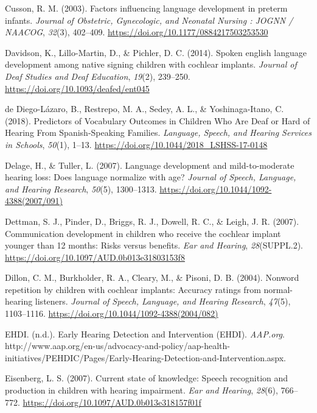 \documentclass[english,man]{apa6}
\begin{document}
\leavevmode\hypertarget{ref-cusson2003}{}%
Cusson, R. M. (2003). Factors influencing language development in preterm infants. \emph{Journal of Obstetric, Gynecologic, and Neonatal Nursing : JOGNN / NAACOG}, \emph{32}(3), 402--409. \url{https://doi.org/10.1177/0884217503253530}

\leavevmode\hypertarget{ref-davidson2014}{}%
Davidson, K., Lillo-Martin, D., \& Pichler, D. C. (2014). Spoken english language development among native signing children with cochlear implants. \emph{Journal of Deaf Studies and Deaf Education}, \emph{19}(2), 239--250. \url{https://doi.org/10.1093/deafed/ent045}

\leavevmode\hypertarget{ref-dediego-lazaro2018}{}%
de Diego-Lázaro, B., Restrepo, M. A., Sedey, A. L., \& Yoshinaga-Itano, C. (2018). Predictors of Vocabulary Outcomes in Children Who Are Deaf or Hard of Hearing From Spanish-Speaking Families. \emph{Language, Speech, and Hearing Services in Schools}, \emph{50}(1), 1--13. \url{https://doi.org/10.1044/2018_LSHSS-17-0148}

\leavevmode\hypertarget{ref-delage2007}{}%
Delage, H., \& Tuller, L. (2007). Language development and mild-to-moderate hearing loss: Does language normalize with age? \emph{Journal of Speech, Language, and Hearing Research}, \emph{50}(5), 1300--1313. \url{https://doi.org/10.1044/1092-4388(2007/091)}

\leavevmode\hypertarget{ref-dettman2007}{}%
Dettman, S. J., Pinder, D., Briggs, R. J., Dowell, R. C., \& Leigh, J. R. (2007). Communication development in children who receive the cochlear implant younger than 12 months: Risks versus benefits. \emph{Ear and Hearing}, \emph{28}(SUPPL.2). \url{https://doi.org/10.1097/AUD.0b013e31803153f8}

\leavevmode\hypertarget{ref-dillon2004}{}%
Dillon, C. M., Burkholder, R. A., Cleary, M., \& Pisoni, D. B. (2004). Nonword repetition by children with cochlear implants: Accuracy ratings from normal-hearing listeners. \emph{Journal of Speech, Language, and Hearing Research}, \emph{47}(5), 1103--1116. \url{https://doi.org/10.1044/1092-4388(2004/082)}

\leavevmode\hypertarget{ref-ehdi}{}%
EHDI. (n.d.). Early Hearing Detection and Intervention (EHDI). \emph{AAP.org}. http://www.aap.org/en-us/advocacy-and-policy/aap-health-initiatives/PEHDIC/Pages/Early-Hearing-Detection-and-Intervention.aspx.

\leavevmode\hypertarget{ref-eisenberg2007}{}%
Eisenberg, L. S. (2007). Current state of knowledge: Speech recognition and production in children with hearing impairment. \emph{Ear and Hearing}, \emph{28}(6), 766--772. \url{https://doi.org/10.1097/AUD.0b013e318157f01f}
\end{document}
